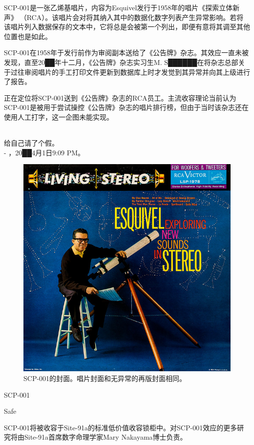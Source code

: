 SCP-001是一张乙烯基唱片，内容为Esquivel发行于1958年的唱片《探索立体新声》 （RCA）。该唱片会对将其纳入其中的数据化数字列表产生异常影响。若将该唱片列入数据保存的文本中，它将总是会被第一个列出，即便有意将其调至其他位置也是如此。

SCP-001在1958年于发行前作为审阅副本送给了《公告牌》杂志。其效应一直未被发现，直至20██年十二月，《公告牌》杂志实习生M. S██████在将杂志总部关于过往审阅唱片的手工打印文件更新到数据库上时才发觉到其异常并向其上级进行了报告。

正在定位将SCP-001送到《公告牌》杂志的RCA员工。主流收容理论当前认为SCP-001是被用于尝试操控《公告牌》杂志的唱片排行榜，但由于当时该杂志还在使用人工打字，这一企图未能实现。


\newpage



\begin{scpbox}
 \\
给自己请了个假。 \\
- ，20██4月1日9:09 PM。
\end{scpbox}

\begin{figure}[H]
	\centering
	\includegraphics[width=0.5\linewidth]{images/SCP-001-a-record-2.jpg}
	\caption*{SCP-001的封面。唱片封面和无异常的再版封面相同。}
\end{figure}

SCP-001

Safe

SCP-001将被收容于Site-91a的标准低价值收容锁柜中。对SCP-001效应的更多研究将由Site-91a首席数字命理学家Mary Nakayama博士负责。

